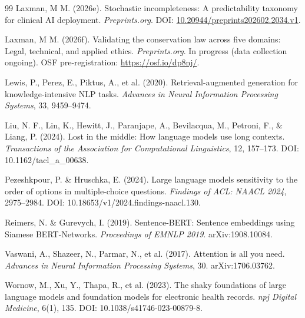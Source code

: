 \documentclass[11pt,a4paper]{article}
\begin{document}
\begin{thebibliography}{99}
Laxman, M M. (2026e).
\newblock Stochastic incompleteness: A predictability taxonomy for clinical AI deployment.
\newblock \emph{Preprints.org}.
\newblock DOI: \href{https://doi.org/10.20944/preprints202602.2034.v1}{10.20944/preprints202602.2034.v1}.

Laxman, M M. (2026f).
\newblock Validating the conservation law across five domains: Legal, technical, and applied ethics.
\newblock \emph{Preprints.org}. In progress (data collection ongoing).
\newblock OSF pre-registration: \url{https://osf.io/dp8nj/}.

Lewis, P., Perez, E., Piktus, A., et al. (2020).
\newblock Retrieval-augmented generation for knowledge-intensive NLP tasks.
\newblock \emph{Advances in Neural Information Processing Systems}, 33, 9459--9474.

Liu, N. F., Lin, K., Hewitt, J., Paranjape, A., Bevilacqua, M., Petroni, F., \& Liang, P. (2024).
\newblock Lost in the middle: How language models use long contexts.
\newblock \emph{Transactions of the Association for Computational Linguistics}, 12, 157--173.
\newblock DOI: 10.1162/tacl\_a\_00638.

Pezeshkpour, P. \& Hruschka, E. (2024).
\newblock Large language models sensitivity to the order of options in multiple-choice questions.
\newblock \emph{Findings of ACL: NAACL 2024}, 2975--2984.
\newblock DOI: 10.18653/v1/2024.findings-naacl.130.

Reimers, N. \& Gurevych, I. (2019).
\newblock Sentence-BERT: Sentence embeddings using Siamese BERT-Networks.
\newblock \emph{Proceedings of EMNLP 2019}.
\newblock arXiv:1908.10084.

Vaswani, A., Shazeer, N., Parmar, N., et al. (2017).
\newblock Attention is all you need.
\newblock \emph{Advances in Neural Information Processing Systems}, 30.
\newblock arXiv:1706.03762.

Wornow, M., Xu, Y., Thapa, R., et al. (2023).
\newblock The shaky foundations of large language models and foundation models for electronic health records.
\newblock \emph{npj Digital Medicine}, 6(1), 135.
\newblock DOI: 10.1038/s41746-023-00879-8.

\end{thebibliography}
\end{document}
